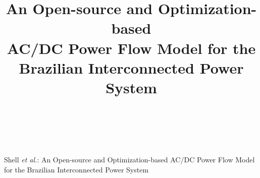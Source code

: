 \documentclass[letterpaper,journal]{IEEEtran}
\begin{document}
\title{{\fontsize{24pt}{24pt}\selectfont An Open-source and Optimization-based\\ AC/DC Power Flow Model for the Brazilian Interconnected Power System}}



\author{
	\\
	 \\
}
\markboth{}%
{Shell \MakeLowercase{\textit{et al.}}: An Open-source and Optimization-based AC/DC Power Flow Model for the Brazilian Interconnected Power System}

\IEEEpubid{}

\maketitle
\end{document}
